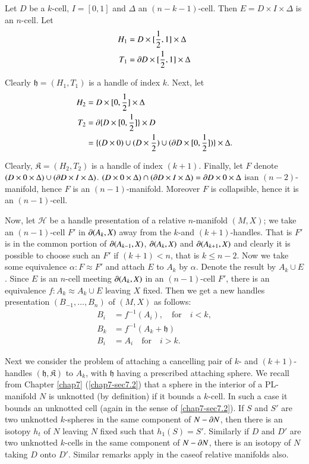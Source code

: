 Let $D$ be a $k$-cell, $I=[0,1]$ and $\Delta$ an $(n-k-1)$-cell. Then $E=D\times I\times \Delta$ is an $n$-cell. Let
\begin{align*}
H_{1} &= D\times [\frac{1}{2},1]\times \Delta\\
T_{1} &= \partial D\times[\frac{1}{2},1]\times \Delta
\end{align*}

Clearly $\mathfrak{h}=(H_{1},T_{1})$ is a handle of index $k$. Next, let
\begin{align*}
H_{2} &= D\times [0,\frac{1}{2}]\times \Delta\\
T_{2} &= \partial \{D\times [0,\frac{1}{2}]\}\times D\\
&= \{(D\times 0)\cup (D\times \frac{1}{2})\cup (\partial D\times [0,\frac{1}{2}])\}\times \Delta.
\end{align*}

Clearly, $\mathfrak{K}=(H_{2},T_{2})$ is a handle of index $(k+1)$. Finally, let $F$ denote $(D\times 0\times \Delta)\cup (\partial D\times I\times \Delta)$. $(D\times 0\times \Delta)\cap (\partial D\times I\times \Delta)=\partial D\times 0\times \Delta$ is\pageoriginale an $(n-2)$-manifold, hence $F$ is an $(n-1)$-manifold. Moreover $F$ is collapsible, hence it is an $(n-1)$-cell.

Now, let $\mathscr{H}$ be a handle presentation of a relative $n$-manifold $(M,X)$; we take an $(n-1)$-cell $F'$ in $\partial(A_{k},X)$ away from the $k$-and $(k+1)$-handles. That is $F'$ is in the common portion of $\partial(A_{k-1},X)$, $\partial(A_{k},X)$ and $\partial(A_{k+1},X)$ and clearly it is possible to choose such an $F'$ if $(k+1)<n$, that is $k\leq n-2$. Now we take some equivalence $\alpha:F\approx F'$ and attach $E$ to $A_{k}$ by $\alpha$. Denote the result by $A_{k}\cup E$. Since $E$ is an $n$-cell meeting $\partial(A_{k},X)$ in an $(n-1)$-cell $F'$, there is an equivalence $f:A_{k}\approx A_{k}\cup E$ leaving $X$ fixed. Then we get a new handles presentation $(B_{-1},\ldots,B_{n})$ of $(M,X)$ as follows:
\begin{align*}
B_{i} &= f^{-1}(A_{i}),\quad\text{for}\quad i<k,\\
B_{k} &= f^{-1}(A_{k}+\mathfrak{h})\\
B_{i} &= A_{i}\quad \text{for}\quad i>k.
\end{align*}

Next we consider the problem of attaching a cancelling pair of $k$- and $(k+1)$-handles $(\mathfrak{h},\mathfrak{K})$ to $A_{k}$, with $\mathfrak{h}$ having a prescribed attaching sphere. We recall from Chapter \ref{chap7} (\ref{chap7-sec7.2}) that a sphere in the interior of a PL-manifold $N$ is unknotted (by definition) if it bounds a $k$-cell. In such a case it bounds an unknotted cell (again in the sense of \ref{chap7-sec7.2}). If $S$ and $S'$ are two unknotted $k$-spheres in the same component of $N-\partial N$, then there is an isotopy $h_{t}$ of $N$ leaving $N$ fixed such that $h_{1}(S)=S'$. Similarly if $D$ and $D'$ are two unknotted $k$-cells in the same component of $N-\partial N$, there is an isotopy of $N$ taking $D$ onto $D'$. Similar remarks apply in the case\pageoriginale of relative
manifolds also.

